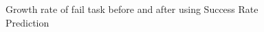 \documentclass[12pt,oneside,openright,a4paper]{cpe-english-project}
\begin{document}
\begin{enumerate}
\begin{figure}[!h]\centering
    \setlength{\fboxrule}{0mm} %
    \setlength{\fboxsep}{0cm}
    \caption{Growth rate of fail task before and after using Success Rate Prediction}\label{fig:fail2}
\end{figure}


\end{enumerate}
\end{document}
